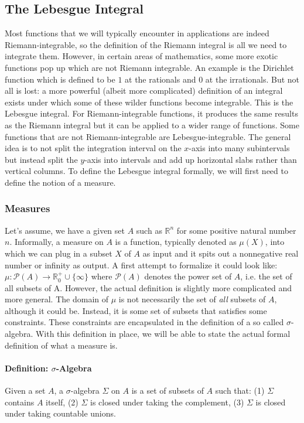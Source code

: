 \subsection{The Lebesgue Integral} 
Most functions that we will typically encounter in applications are indeed Riemann-integrable, so the definition of the Riemann integral is all we need to integrate them. However, in certain areas of mathematics, some more exotic functions pop up which are not Riemann integrable. An example is the Dirichlet function which is defined to be $1$ at the rationals and $0$ at the irrationals. But not all is lost: a more powerful (albeit more complicated) definition of an integral exists under which some of these wilder functions become integrable. This is the Lebesgue integral. For Riemann-integrable functions, it produces the same results as the Riemann integral but it can be applied to a wider range of functions. Some functions that are not Riemann-integrable are Lebesgue-integrable. The general idea is to not split the integration interval on the $x$-axis into many subintervals but instead split the $y$-axis into intervals and add up horizontal slabs rather than vertical columns. To define the Lebesgue integral formally, we will first need to define the notion of a measure.


\subsubsection{Measures}
Let's assume, we have a given set $A$ such as $\mathbb{R}^n$ for some positive natural number $n$. Informally, a measure on $A$ is a function, typically denoted as $\mu(X)$, into which we can plug in a subset $X$ of $A$ as input and it spits out a nonnegative real number or infinity as output. A first attempt to formalize it could look like: $\mu: \mathcal{P}(A) \rightarrow \mathbb{R}^+_0 \cup \{  \infty \}$ where $\mathcal{P}(A)$ denotes the power set of $A$, i.e. the set of all subsets of A. However, the actual definition is slightly more complicated and more general. The domain of $\mu$ is not necessarily the set of \emph{all} subsets of $A$, although it could be. Instead, it is some set of subsets that satisfies some constraints. These constraints are encapsulated in the definition of a so called $\sigma$-algebra. With this definition in place, we will be able to state the actual formal definition of what a measure is.

\paragraph{Definition: $\sigma$-Algebra} Given a set $A$, a $\sigma$-algebra $\Sigma$ on $A$ is a set of subsets of $A$ such that: (1) $\Sigma$ contains $A$ itself, (2) $\Sigma$ is closed under taking the complement, (3) $\Sigma$ is closed under taking countable unions.

